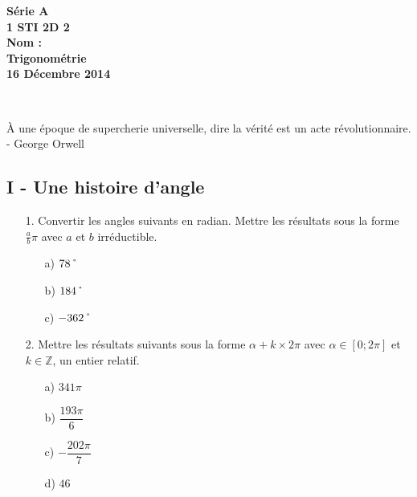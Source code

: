 \documentclass[12pt]{article}
\begin{document}

\begin{minipage}[t]{\textwidth}
  \raggedright
      {\bfseries Série A}\\[.35ex]
      {\bfseries 1 STI 2D 2}\\[.35ex]
      {\bfseries Nom : }\\[.35ex]
      \vspace*{-1cm}
      \raggedleft
          {\bfseries Trigonométrie}\\[.35ex]
          {\bfseries 16 Décembre 2014}\\[.35ex]
\end{minipage}\\[1em]

\begin{center}
  \textsf{À une époque de supercherie universelle, dire la vérité est un acte révolutionnaire. - George Orwell}\\
\end{center}

\setlength{\columnseprule}{0pt}

\subsection*{I - Une histoire d'angle}

\begin{enumerate}
\item[1.] Convertir les angles suivants en radian. Mettre les résultats sous la forme $\frac{a}{b}\pi$ avec $a$ et $b$ irréductible.

  \begin{multicols}{3}
    \begin{enumerate}
    \item[a)] $78\char23$
    \item[b)] $184\char23$
    \item[c)] $-362\char23$
    \end{enumerate}
  \end{multicols}

\item[2.] Mettre les résultats suivants sous la forme $\alpha + k\times 2\pi$ avec $\alpha \in [0 ; 2\pi]$ et $k \in \mathbb{Z}$, un entier relatif. 

  \begin{multicols}{4}
    \begin{enumerate}
    \item[a)] $341 \pi$
    \item[b)] $\dfrac{193 \pi}{6} $
    \item[c)] $- \dfrac{202 \pi}{7}$ 
    \item[d)] $46$
    \end{enumerate}
  \end{multicols}

\end{enumerate}
\end{document}
